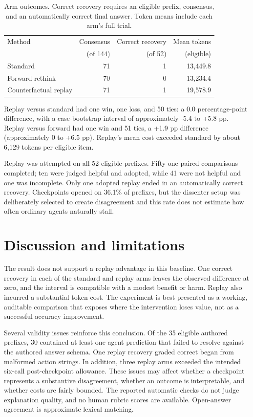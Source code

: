 \documentclass[11pt,a4paper,twocolumn]{article}
\begin{document}
\begin{table}[h]
\centering
\small
\begin{tabular}{lrrr}
\toprule
Method & Consensus & Correct recovery & Mean tokens\\
 & (of 144) & (of 52) & (eligible)\\
\midrule
Standard & 71 & 1 & 13,449.8\\
Forward rethink & 70 & 0 & 13,234.4\\
Counterfactual replay & 71 & 1 & 19,578.9\\
\bottomrule
\end{tabular}
\caption{Arm outcomes. Correct recovery requires an eligible prefix, consensus, and an automatically correct final answer. Token means include each arm's full trial.}
\label{tab:results}
\end{table}

Replay versus standard had one win, one loss, and 50 ties: a 0.0 percentage-point difference, with a case-bootstrap interval of approximately -5.4 to +5.8 pp. Replay versus forward had one win and 51 ties, a +1.9 pp difference (approximately 0 to +6.5 pp). Replay's mean cost exceeded standard by about 6,129 tokens per eligible item.

Replay was attempted on all 52 eligible prefixes. Fifty-one paired comparisons completed; ten were judged helpful and adopted, while 41 were not helpful and one was incomplete. Only one adopted replay ended in an automatically correct recovery. Checkpoints opened on 36.1\% of prefixes, but the dissenter setup was deliberately selected to create disagreement and this rate does not estimate how often ordinary agents naturally stall.

\section{Discussion and limitations}
The result does not support a replay advantage in this baseline. One correct recovery in each of the standard and replay arms leaves the observed difference at zero, and the interval is compatible with a modest benefit or harm. Replay also incurred a substantial token cost. The experiment is best presented as a working, auditable comparison that exposes where the intervention loses value, not as a successful accuracy improvement.

Several validity issues reinforce this conclusion. Of the 35 eligible authored prefixes, 30 contained at least one agent prediction that failed to resolve against the authored answer schema. One replay recovery graded correct began from malformed action strings. In addition, three replay arms exceeded the intended six-call post-checkpoint allowance. These issues may affect whether a checkpoint represents a substantive disagreement, whether an outcome is interpretable, and whether costs are fairly bounded. The reported automatic checks do not judge explanation quality, and no human rubric scores are available. Open-answer agreement is approximate lexical matching.
\end{document}
